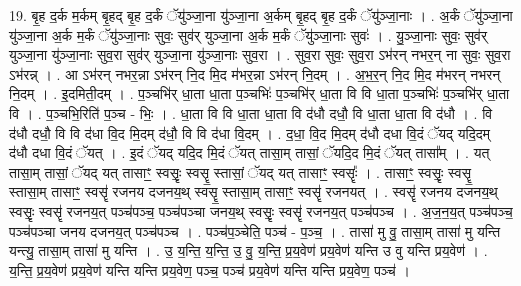 \documentclass[17pt]{extarticle}
\begin{document}
19. बृ॒ह द॒र्क म॒र्कम् बृ॒हद् बृ॒ह द॒र्कं ॅयु॑ञ्जा॒ना यु॑ञ्जा॒ना अ॒र्कम् बृ॒हद् बृ॒ह द॒र्कं ॅयु॑ञ्जा॒नाः । . अ॒र्कं ॅयु॑ञ्जा॒ना यु॑ञ्जा॒ना अ॒र्क म॒र्कं ॅयु॑ञ्जा॒नाः सुवः॒ सुव॑र् युञ्जा॒ना अ॒र्क म॒र्कं ॅयु॑ञ्जा॒नाः सुवः॑ । . यु॒ञ्जा॒नाः सुवः॒ सुव॑र् युञ्जा॒ना यु॑ञ्जा॒नाः सुव॒रा सुव॑र् युञ्जा॒ना यु॑ञ्जा॒नाः सुव॒रा । . सुव॒रा सुवः॒ सुव॒रा ऽभ॑रन् नभर॒न् ना सुवः॒ सुव॒रा ऽभ॑रन्न् । . आ ऽभ॑रन् नभर॒न्ना ऽभ॑रन् नि॒द मि॒द म॑भर॒न्ना ऽभ॑रन् नि॒दम् । . अ॒भ॒र॒न् नि॒द मि॒द म॑भरन् नभरन् नि॒दम् । . इ॒दमिती॒दम् । . प॒ञ्चभि॑र् धा॒ता धा॒ता प॒ञ्चभिः॑ प॒ञ्चभि॑र् धा॒ता वि वि धा॒ता प॒ञ्चभिः॑ प॒ञ्चभि॑र् धा॒ता वि । . प॒ञ्चभि॒रिति॑ प॒ञ्च - भिः॒ । . धा॒ता वि वि धा॒ता धा॒ता वि द॑धौ दधौ॒ वि धा॒ता धा॒ता वि द॑धौ । . वि द॑धौ दधौ॒ वि वि द॑धा वि॒द मि॒दम् द॑धौ॒ वि वि द॑धा वि॒दम् । . द॒धा॒ वि॒द मि॒दम् द॑धौ दधा वि॒दं ॅयद् यदि॒दम् द॑धौ दधा वि॒दं ॅयत् । . इ॒दं ॅयद् यदि॒द मि॒दं ॅयत् तासा॒म् तासां॒ ॅयदि॒द मि॒दं ॅयत् तासा᳚म् । . यत् तासा॒म् तासां॒ ॅयद् यत् तासाꣳ॒॒ स्वसॄः॒ स्वसॄ॒ स्तासां॒ ॅयद् यत् तासाꣳ॒॒ स्वसॄः᳚ । . तासाꣳ॒॒ स्वसॄः॒ स्वसॄ॒ स्तासा॒म् तासाꣳ॒॒ स्वसॄ॑ रजनय दजनय॒थ् स्वसॄ॒ स्तासा॒म् तासाꣳ॒॒ स्वसॄ॑ रजनयत् । . स्वसॄ॑ रजनय दजनय॒थ् स्वसॄः॒ स्वसॄ॑ रजनय॒त् पञ्च॑पञ्च॒ पञ्च॑पञ्चा जनय॒थ् स्वसॄः॒ स्वसॄ॑ रजनय॒त् पञ्च॑पञ्च । . अ॒ज॒न॒य॒त् पञ्च॑पञ्च॒ पञ्च॑पञ्चा जनय दजनय॒त् पञ्च॑पञ्च । . पञ्च॑प॒ञ्चेति॒ पञ्च॑ - प॒ञ्च॒ । . तासा॑ मु वु॒ तासा॒म् तासा॑ मु यन्ति यन्त्यु॒ तासा॒म् तासा॑ मु यन्ति । . उ॒ य॒न्ति॒ य॒न्ति॒ उ॒ वु॒ य॒न्ति॒ प्र॒य॒वेण॑ प्रय॒वेण॑ यन्ति उ वु यन्ति प्रय॒वेण॑ । . य॒न्ति॒ प्र॒य॒वेण॑ प्रय॒वेण॑ यन्ति यन्ति प्रय॒वेण॒ पञ्च॒ पञ्च॑ प्रय॒वेण॑ यन्ति यन्ति प्रय॒वेण॒ पञ्च॑ । \newline
\end{document}
